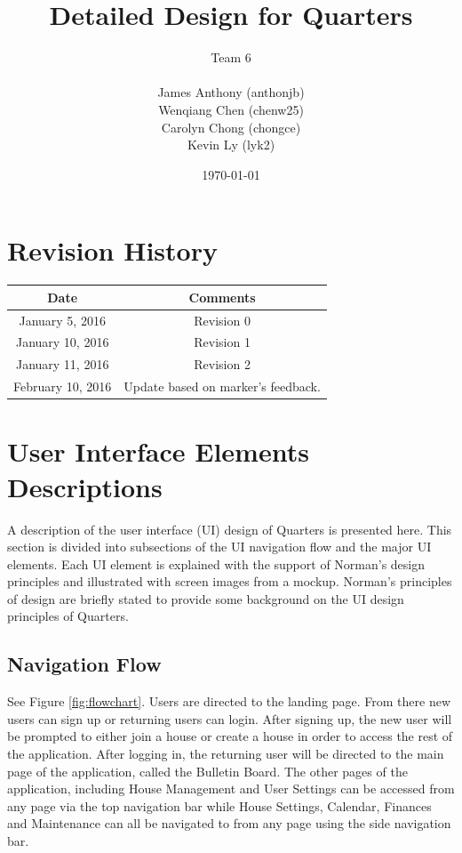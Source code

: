 \documentclass[12pt]{article}
\begin{document}
\title{Detailed Design for Quarters}
\author{Team 6\\ \\James Anthony (anthonjb)\\ Wenqiang Chen (chenw25)\\ Carolyn Chong
(chongce)\\ Kevin Ly (lyk2)}
\date{\today}

\maketitle

\pagebreak

\tableofcontents
\listoffigures

\section*{Revision History}
\begin{tabular}{|c|c|}
\hline
\textbf{Date}  & \textbf{Comments} \\ \hline
January 5, 2016 & Revision 0 \\ \hline
January 10, 2016 & Revision 1\\ \hline
January 11, 2016 & Revision 2\\ \hline
February 10, 2016 & Update based on marker's feedback. \\ \hline
\end{tabular}

\pagebreak


\section{User Interface Elements Descriptions}

A description of the user interface (UI) design of Quarters is presented here. This section is divided into subsections of the UI navigation flow and the major UI elements. Each UI element is explained with the support of Norman's design principles and illustrated with screen images from a mockup. Norman's principles of design are briefly stated to provide some background on the UI design principles of Quarters.

\subsection{Navigation Flow}
See Figure \ref{fig:flowchart}. Users are directed to the landing page. From there new users can sign up or returning users can login. After signing up, the new user will be prompted to either join a house or create a house in order to access the rest of the application. After logging in, the returning user will be directed to the main page of the application, called the Bulletin Board. The other pages of the application, including House Management and User Settings can be accessed from any page via the top navigation bar while House Settings, Calendar, Finances and Maintenance can all be navigated to from any page using the side navigation bar.\\
\end{document}
